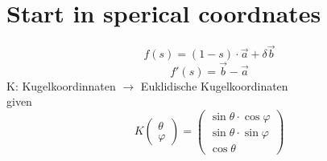 \section{Start in sperical coordnates}
\begin{equation}
f(s)=(1-s)\cdot\vec{a}+\delta\vec{b}
\end{equation}
\begin{equation}
    f'(s)=\vec{b}-\vec{a}
\end{equation}
K: Kugelkoordinnaten $\rightarrow$ Euklidische Kugelkoordinaten\\
given
\begin{equation*}
    K \begin{pmatrix}\theta \\ \varphi\end{pmatrix}=
    \begin{pmatrix}
        \sin\theta\cdot\cos\varphi \\
        \sin\theta\cdot\sin\varphi \\
        \cos\theta
    \end{pmatrix}
\end{equation*}
